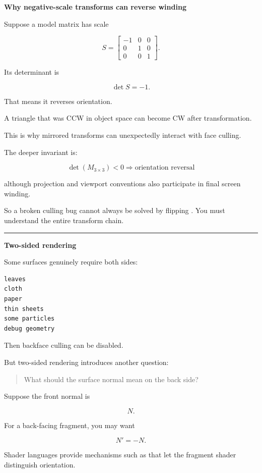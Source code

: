 \textbf{Why negative-scale transforms can reverse winding}

Suppose a model matrix has scale

\[
S=
\begin{bmatrix}
-1&0&0\\
0&1&0\\
0&0&1
\end{bmatrix}.
\]

Its determinant is

\[
\det S=-1.
\]

That means it reverses orientation.

A triangle that was CCW in object space can become CW after transformation.

This is why mirrored transforms can unexpectedly interact with face culling.

The deeper invariant is:

\[
\boxed{
\det(M_{3\times3})<0
\Rightarrow
\text{orientation reversal}
}
\]

although projection and viewport conventions also participate in final screen winding.

So a broken culling bug cannot always be solved by flipping . You must understand the entire transform chain.

\begin{center}\rule{0.5\linewidth}{0.5pt}\end{center}

\textbf{Two-sided rendering}

Some surfaces genuinely require both sides:

\begin{verbatim}
leaves
cloth
paper
thin sheets
some particles
debug geometry
\end{verbatim}

Then backface culling can be disabled.

But two-sided rendering introduces another question:

\begin{quote}
What should the surface normal mean on the back side?
\end{quote}

Suppose the front normal is

\[
N.
\]

For a back-facing fragment, you may want

\[
N'=-N.
\]

Shader languages provide mechanisms such as  that let the fragment shader distinguish orientation.

